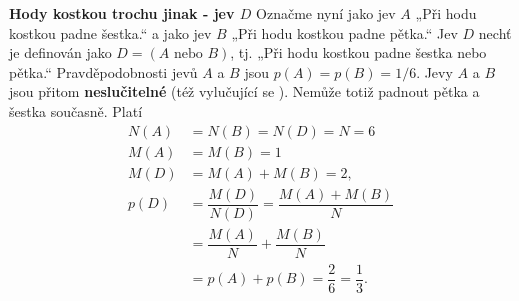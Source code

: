 \begin{mdframed}[style=mdexam]
  \begin{example}\label{mai:exam056}
    \textbf{Hody kostkou trochu jinak - jev \(D\)}\newline
    Označme nyní jako jev \(A\) „Při hodu kostkou padne šestka.“ a jako jev \(B\) „Při hodu kostkou 
    padne pětka.“ Jev \(D\) nechť je definován jako \(D = (A\text{ nebo }B)\), tj. „Při hodu kostkou 
    padne šestka nebo pětka.“ Pravděpodobnosti jevů \(A\) a \(B\) jsou \(p(A) = p(B) = 1/6\). Jevy 
    \(A\) a \(B\) jsou přitom \textbf{neslučitelné} (též vylučující se ). Nemůže
    totiž padnout pětka a šestka současně. Platí
    \begin{align*}
      N(A) &= N(B) = N(D) = N = 6                                                              \\
      M(A) &= M(B) = 1                                                                         \\
      M(D) &= M(A) + M(B) = 2,                                                                 \\
      p(D) &= \dfrac{M(D)}{N(D)} = \dfrac{M(A) + M(B)}{N}                                      \\
           &= \dfrac{M(A)}{N} + \dfrac{M(B)}{N}                                                \\
           &= p(A) + p(B) = \dfrac{2}{6} = \dfrac{1}{3}.
    \end{align*}
  \end{example}
\end{mdframed}